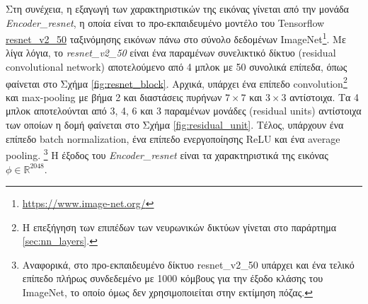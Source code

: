 Στη συνέχεια, η εξαγωγή των χαρακτηριστικών της εικόνας γίνεται από την μονάδα \textsl{Encoder\_resnet}, η οποία είναι το προ-εκπαιδευμένο μοντέλο του Tensorflow \href{https://github.com/tensorflow/models/blob/master/research/slim/nets/resnet\_v2.py}{resnet\_v2\_50} ταξινόμησης εικόνων πάνω στο σύνολο δεδομένων ImageNet\footnote{\href{https://www.image-net.org/}{https://www.image-net.org/}}. Με λίγα λόγια, το \textsl{resnet\_v2\_50} είναι ένα παραμένων συνελικτικό δίκτυο (residual convolutional network) αποτελούμενο από 4 μπλοκ με 50 συνολικά επίπεδα, όπως φαίνεται στο Σχήμα \ref{fig:resnet_block}. Αρχικά, υπάρχει ένα επίπεδο convolution\footnote{Η επεξήγηση των επιπέδων των νευρωνικών δικτύων γίνεται στο παράρτημα \ref{sec:nn_layers}.} και max-pooling με βήμα 2 και διαστάσεις πυρήνων $7 \times 7$ και $3 \times 3$ αντίστοιχα. Τα 4 μπλοκ αποτελούνται από 3, 4, 6 και 3 παραμένων μονάδες (residual units) αντίστοιχα των οποίων η δομή φαίνεται στο Σχήμα \ref{fig:residual_unit}. Τέλος, υπάρχουν ένα επίπεδο batch normalization, ένα επίπεδο ενεργοποίησης ReLU και ένα average pooling. \footnote{Αναφορικά, στο προ-εκπαιδευμένο δίκτυο resnet\_v2\_50 υπάρχει και ένα τελικό επίπεδο πλήρως συνδεδεμένο με 1000 κόμβους για την έξοδο κλάσης του ImageNet, το οποίο όμως δεν χρησιμοποιείται στην εκτίμηση πόζας.} Η έξοδος του \textsl{Encoder\_resnet} είναι τα χαρακτηριστικά της εικόνας $\phi \in \mathbb{R}^{2048}$.

